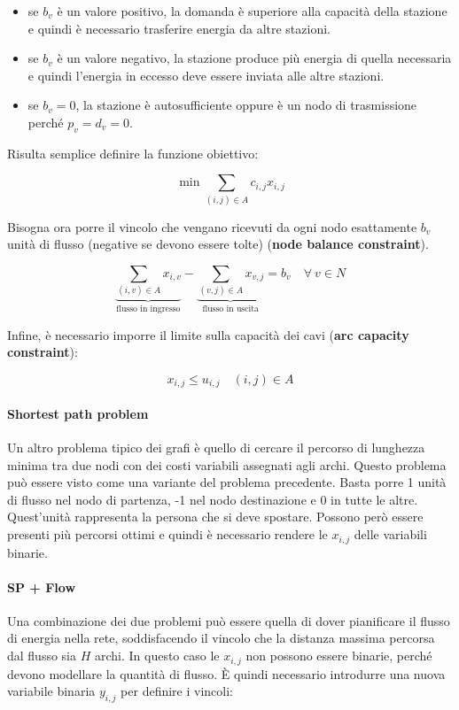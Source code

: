 \begin{itemize}
	\item se $b_v$ è un valore positivo, la domanda è superiore alla capacità della stazione e quindi è necessario trasferire energia da altre stazioni.
	\item se $b_v$ è un valore negativo, la stazione produce più energia di quella necessaria e quindi l'energia in eccesso deve essere inviata alle altre stazioni.
	\item se $b_v = 0$, la stazione è autosufficiente oppure è un nodo di trasmissione perché $p_v = d_v = 0$.
\end{itemize}

\noindent Risulta semplice definire la funzione obiettivo:

$$
\min \sum\limits_{(i,j) \in A} c_{i,j} x_{i,j}
$$

\noindent Bisogna ora porre il vincolo che vengano ricevuti da ogni nodo esattamente $b_v$ unità di flusso (negative se devono essere tolte) (\textbf{node balance constraint}).

$$
\underbrace{\sum\limits_{(i,v) \in A} x_{i,v}}_{\text{flusso in ingresso}} - \underbrace{\sum\limits_{(v,j) \in A} x_{v,j}}_{\text{flusso in uscita}} = b_v \quad \forall \: v \in N
$$ 

\noindent Infine, è necessario imporre il limite sulla capacità dei cavi (\textbf{arc capacity constraint}):

$$
x_{i,j} \leq u_{i,j} \quad (i,j) \in A
$$

\paragraph{Shortest path problem} Un altro problema tipico dei grafi è quello di cercare il percorso di lunghezza minima tra due nodi con dei costi variabili assegnati agli archi.
Questo problema può essere visto come una variante del problema precedente. Basta porre 1 unità di flusso nel nodo di partenza, -1 nel nodo destinazione e 0 in tutte le altre. Quest'unità rappresenta la persona che si deve spostare.
Possono però essere presenti più percorsi ottimi e quindi è necessario rendere le $x_{i,j}$ delle variabili binarie.

\paragraph{SP + Flow} Una combinazione dei due problemi può essere quella di dover pianificare il flusso di energia nella rete, soddisfacendo il vincolo che la distanza massima percorsa dal flusso sia $H$ archi.
In questo caso le $x_{i,j}$ non possono essere binarie, perché devono modellare la quantità di flusso. \`E quindi necessario introdurre una nuova variabile binaria $y_{i,j}$ per definire i vincoli:


